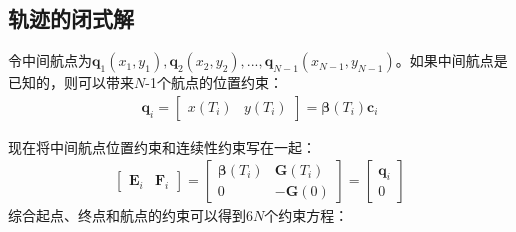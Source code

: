 \documentclass[master,academic]{ysuthesis} %
\begin{document}
		\subsection{轨迹的闭式解} 
		令中间航点为$\bm{q}_1(x_1,y_1),\bm{q}_2(x_2,y_2),...,\bm{q}_{N-1}(x_{N-1},y_{N-1})$。如果中间航点是已知的，则可以带来$N$-1个航点的位置约束：
		\begin{equation}
			\begin{aligned}
				\bm{q}_i = \begin{bmatrix}
					x(T_i)& y(T_i)
				\end{bmatrix} = \bm{\beta}(T_i)\bm{c}_i
			\end{aligned}
		\end{equation}
		
		现在将中间航点位置约束和连续性约束写在一起：
		\begin{equation}
			\begin{aligned}
				\begin{bmatrix}
					\bm{E}_i &\bm{F}_i
				\end{bmatrix}=
				\begin{bmatrix}
					\bm{\beta} ( T_i )& \bm{G}( T_i ) \\
					0 & -\bm{G}( 0 )
				\end{bmatrix}  =\begin{bmatrix}
					\bm{q}_i\\
					0
				\end{bmatrix}
			\end{aligned}
		\end{equation}
		综合起点、终点和航点的约束可以得到$6N$个约束方程：
\end{document}
